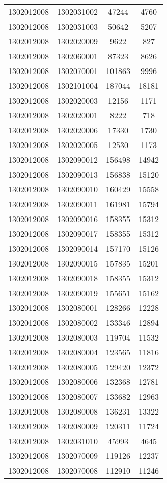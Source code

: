 \begin{longtable}{llcc}
1302012008 & 1302031002 & 47244 & 4760\\
1302012008 & 1302031003 & 50642 & 5207\\
1302012008 & 1302020009 & 9622 & 827\\
1302012008 & 1302060001 & 87323 & 8626\\
1302012008 & 1302070001 & 101863 & 9996\\
1302012008 & 1302101004 & 187044 & 18181\\
1302012008 & 1302020003 & 12156 & 1171\\
1302012008 & 1302020001 & 8222 & 718\\
1302012008 & 1302020006 & 17330 & 1730\\
1302012008 & 1302020005 & 12530 & 1173\\
1302012008 & 1302090012 & 156498 & 14942\\
1302012008 & 1302090013 & 156838 & 15120\\
1302012008 & 1302090010 & 160429 & 15558\\
1302012008 & 1302090011 & 161981 & 15794\\
1302012008 & 1302090016 & 158355 & 15312\\
1302012008 & 1302090017 & 158355 & 15312\\
1302012008 & 1302090014 & 157170 & 15126\\
1302012008 & 1302090015 & 157835 & 15201\\
1302012008 & 1302090018 & 158355 & 15312\\
1302012008 & 1302090019 & 155651 & 15162\\
1302012008 & 1302080001 & 128266 & 12228\\
1302012008 & 1302080002 & 133346 & 12894\\
1302012008 & 1302080003 & 119704 & 11532\\
1302012008 & 1302080004 & 123565 & 11816\\
1302012008 & 1302080005 & 129420 & 12372\\
1302012008 & 1302080006 & 132368 & 12781\\
1302012008 & 1302080007 & 133682 & 12963\\
1302012008 & 1302080008 & 136231 & 13322\\
1302012008 & 1302080009 & 120311 & 11724\\
1302012008 & 1302031010 & 45993 & 4645\\
1302012008 & 1302070009 & 119126 & 12237\\
1302012008 & 1302070008 & 112910 & 11246\\

\end{longtable}
